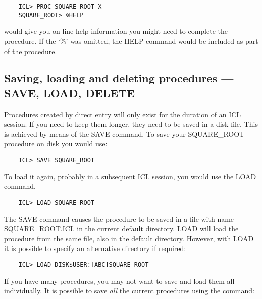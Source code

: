 \begin{small}
\begin{verbatim}
    ICL> PROC SQUARE_ROOT X
    SQUARE_ROOT> %HELP
\end{verbatim}
\end{small}

would give you on-line help information you might need to complete the
procedure.
If the `\%' was omitted, the HELP command would be included as part of the
procedure.

\subsection{Saving, loading and deleting procedures --- SAVE, LOAD, DELETE}

Procedures created by direct entry will only exist for the duration of an ICL
session.
If you need to keep them longer, they need to be saved in a disk file.
This is achieved by means of the SAVE command.
To save your SQUARE\_ROOT procedure on disk you would use:

\begin{small}
\begin{verbatim}
    ICL> SAVE SQUARE_ROOT
\end{verbatim}
\end{small}

To load it again, probably in a subsequent ICL session, you would use the LOAD
command.

\begin{small}
\begin{verbatim}
    ICL> LOAD SQUARE_ROOT
\end{verbatim}
\end{small}

The SAVE command causes the procedure to be saved in a file with name
SQUARE\_ROOT.ICL in the current default directory. 
LOAD will load the procedure from the same file, also in the default directory.
However, with LOAD it is possible to specify an alternative directory if
required:

\begin{small}
\begin{verbatim}
    ICL> LOAD DISK$USER:[ABC]SQUARE_ROOT
\end{verbatim}
\end{small}

If you have many procedures, you may not want to save and load them all
individually.
It is possible to save {\em all} the current procedures using the command:

